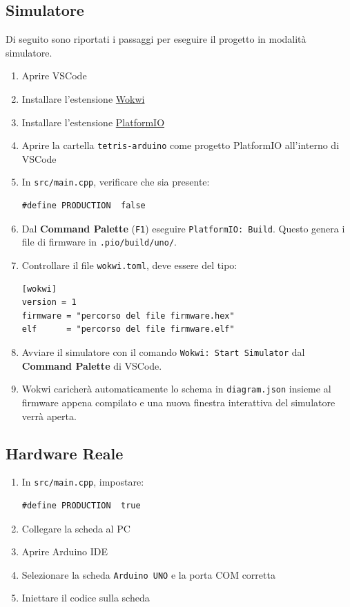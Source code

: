 \documentclass[a4paper, 12pt]{article}
\begin{document}
\subsection{Simulatore}
Di seguito sono riportati i passaggi per eseguire il progetto in modalità simulatore.
\begin{enumerate}
    \item Aprire VSCode
    \item Installare l'estensione \href{https://marketplace.visualstudio.com/items?itemName=Wokwi.wokwi-vscode}{Wokwi}
    \item Installare l'estensione \href{https://marketplace.visualstudio.com/items?itemName=platformio.platformio-ide}{PlatformIO}
    \item Aprire la cartella \texttt{tetris-arduino} come progetto PlatformIO all'interno di VSCode
    \item In \texttt{src/main.cpp}, verificare che sia presente:
          \begin{lstlisting}
#define PRODUCTION  false
	      \end{lstlisting}
    \item Dal \textbf{Command Palette} (\texttt{F1}) eseguire \texttt{PlatformIO: Build}.
          Questo genera i file di firmware in \texttt{.pio/build/uno/}.
    \item Controllare il file \texttt{wokwi.toml}, deve essere del tipo:
          \begin{verbatim}
[wokwi]
version = 1
firmware = "percorso del file firmware.hex"
elf      = "percorso del file firmware.elf"
	      \end{verbatim}
    \item Avviare il simulatore con il comando \texttt{Wokwi: Start Simulator} dal \textbf{Command Palette} di VSCode.
    \item Wokwi caricherà automaticamente lo schema in \texttt{diagram.json} insieme al firmware appena compilato e una nuova finestra interattiva del simulatore verrà aperta.
\end{enumerate}

\subsection{Hardware Reale}
\begin{enumerate}
    \item In \texttt{src/main.cpp}, impostare:
          \begin{lstlisting}
#define PRODUCTION  true
	      \end{lstlisting}
    \item Collegare la scheda al PC
    \item Aprire Arduino IDE
    \item Selezionare la scheda \texttt{Arduino UNO} e la porta COM corretta
    \item Iniettare il codice sulla scheda
\end{enumerate}
\end{document}
